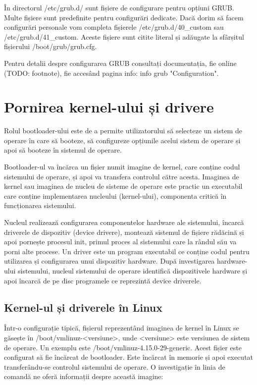 În directorul /etc/grub.d/ sunt fișiere de configurare pentru opțiuni GRUB.
Multe fișiere sunt predefinite pentru configurări dedicate. Dacă dorim să facem
configurări personale vom completa fișierele /etc/grub.d/40_custom sau
/etc/grub.d/41_custom. Aceste fișiere sunt citite literal și adăugate la
sfârșitul fișierului /boot/grub/grub.cfg.

Pentru detalii despre configurarea GRUB consultați documentația, fie online
(TODO: footnote), fie accesând pagina info: info grub "Configuration".

\section{Pornirea kernel-ului și drivere}
\label{sec:boot-bootupos}

Rolul bootloader-ului este de a permite utilizatorului să selecteze un sistem de
operare în care să booteze, să configureze opțiunile acelui sistem de operare și
apoi să booteze în sistemul de operare.

Bootloader-ul va încărca un fișier numit imagine de kernel, care conține codul
sistemului de operare, și apoi va transfera controlul către acesta. Imaginea de
kernel sau imaginea de nucleu de sisteme de operare este practic un executabil
care conține implementarea nucleului (kernel-ului), componenta critică în
funcționarea sistemului.

Nucleul realizează configurarea componentelor hardware ale sistemului, încarcă
driverele de dispozitiv (device drivere), montează sistemul de fișiere rădăcină
și apoi pornește procesul init, primul proces al sistemului care la rândul său
va porni alte procese. Un driver este un program executabil ce conține codul
pentru utilizarea și configurarea unui dispozitiv hardware. După investigarea
hardware-ului sistemului, nucleul sistemului de operare identifică dispozitivele
hardware și apoi încarcă de pe disc programele ce reprezintă device driverele.

\subsection{Kernel-ul și driverele în Linux}
\label{sec:boot-bootupos-linux}

Într-o configurație tipică, fișierul reprezentând imaginea de kernel în Linux se
găsește în /boot/vmlinuz-<versiune>, unde <versiune> este versiunea de sistem de
operare. Un exemplu este /boot/vmlinuz-4.15.0-29-generic. Acest fișier este
configurat să fie încărcat de bootloader. Este încărcat în memorie și apoi
executat transferându-se controlul sistemului de operare. O investigație în
linia de comandă ne oferă informații despre această imagine:

